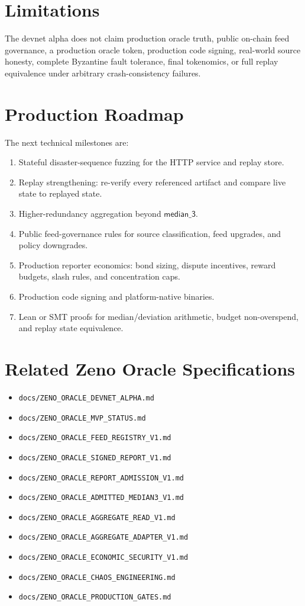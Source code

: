 \documentclass[11pt]{article}
\begin{document}
\section{Limitations}

The devnet alpha does not claim production oracle truth, public on-chain feed
governance, a production oracle token, production code signing, real-world
source honesty, complete Byzantine fault tolerance, final tokenomics, or full
replay equivalence under arbitrary crash-consistency failures.

\section{Production Roadmap}

The next technical milestones are:
\begin{enumerate}[leftmargin=*]
  \item Stateful disaster-sequence fuzzing for the HTTP service and replay
  store.
  \item Replay strengthening: re-verify every referenced artifact and compare
  live state to replayed state.
  \item Higher-redundancy aggregation beyond \(\mathsf{median\_3}\).
  \item Public feed-governance rules for source classification, feed upgrades,
  and policy downgrades.
  \item Production reporter economics: bond sizing, dispute incentives, reward
  budgets, slash rules, and concentration caps.
  \item Production code signing and platform-native binaries.
  \item Lean or SMT proofs for median/deviation arithmetic, budget
  non-overspend, and replay state equivalence.
\end{enumerate}

\section{Related Zeno Oracle Specifications}

\begin{itemize}[leftmargin=*]
  \item \texttt{docs/ZENO\_ORACLE\_DEVNET\_ALPHA.md}
  \item \texttt{docs/ZENO\_ORACLE\_MVP\_STATUS.md}
  \item \texttt{docs/ZENO\_ORACLE\_FEED\_REGISTRY\_V1.md}
  \item \texttt{docs/ZENO\_ORACLE\_SIGNED\_REPORT\_V1.md}
  \item \texttt{docs/ZENO\_ORACLE\_REPORT\_ADMISSION\_V1.md}
  \item \texttt{docs/ZENO\_ORACLE\_ADMITTED\_MEDIAN3\_V1.md}
  \item \texttt{docs/ZENO\_ORACLE\_AGGREGATE\_READ\_V1.md}
  \item \texttt{docs/ZENO\_ORACLE\_AGGREGATE\_ADAPTER\_V1.md}
  \item \texttt{docs/ZENO\_ORACLE\_ECONOMIC\_SECURITY\_V1.md}
  \item \texttt{docs/ZENO\_ORACLE\_CHAOS\_ENGINEERING.md}
  \item \texttt{docs/ZENO\_ORACLE\_PRODUCTION\_GATES.md}
\end{itemize}
\end{document}
